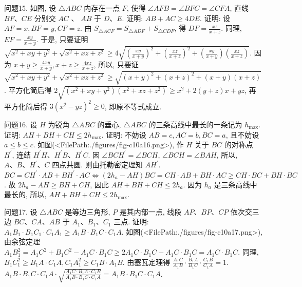 问题15. 如图, 设 $\triangle A B C$ 内存在一点 $F$, 使得 $\angle A F B= \angle B F C=\angle C F A$, 直线 $B F 、 C E$ 分别交 $A C$ 、 $A B$ 于 $D 、 E$. 证明: $A B+A C \geqslant 4 D E$.
证明: 设 $A F=x, B F=y, C F=z$. 由 $S_{\triangle A C F}=S_{\triangle A D F}+S_{\triangle C D F}$, 得 $D F=\frac{x z}{x+z}$. 同理, $E F=\frac{x y}{x+y}$. 于是, 只要证明 $\sqrt{x^2+x y+y^2}+\sqrt{x^2+x z+z^2} \geqslant 4 \sqrt{\left(\frac{x y}{x+y}\right)^2+\left(\frac{x z}{x+z}\right)^2+\left(\frac{x y}{x+y}\right)\left(\frac{x z}{x+z}\right)}$. 因为 $x+ y \geqslant \frac{4 x y}{x+y}, x+z \geqslant \frac{4 x z}{x+z}$, 所以, 只要证 $\sqrt{x^2+x y+y^2}+\sqrt{x^2+x z+z^2} \geqslant \sqrt{(x+y)^2+(x+z)^2+(x+y)(x+z)}$.
平方化简后得 $2 \sqrt{\left(x^2+x y+y^2\right)\left(x^2+x z+z^2\right)} \geqslant x^2+2(y+z) x+y z$, 再平方化简后得 $3\left(x^2-y z\right)^2 \geqslant 0$, 即原不等式成立.



问题16. 设 $H$ 为锐角 $\triangle A B C$ 的垂心, $\triangle A B C$ 的三条高线中最长的一条记为 $h_{\max }$. 证明: $A H+B H+ C H \leqslant 2 h_{\max }$.
证明: 不妨设 $A B=c, A C=b, B C=a$, 且不妨设 $a \leqslant b \leqslant c$. 如图(<FilePath:./figures/fig-c10a16.png>), 作 $H$ 关于 $B C$ 的对称点 $H^{\prime}$, 连结 $H^{\prime} H 、 H^{\prime} B 、 H^{\prime} C$. 因 $\angle B C H^{\prime}=\angle B C H$, $\angle B C H=\angle B A H$, 所以, $A 、 B 、 H^{\prime} 、 C$ 四点共圆.
则由托勒密定理知 $A H^{\prime}$. $B C=C H^{\prime} \cdot A B+B H^{\prime} \cdot A C \Leftrightarrow\left(2 h_a-A H\right) B C=C H \cdot A B+B H \cdot A C \geqslant C H \cdot B C+B H \cdot B C$. 故 $2 h_a-A H \geqslant B H+C H$, 因此 $A H+B H+C H \leqslant 2 h_a$. 因为 $h_a$ 是三条高线中最长的, 所以, $A H+B H+C H \leqslant 2 h_{\max }$.



问题17. 设 $\triangle A B C$ 是等边三角形, $P$ 是其内部一点, 线段 $A P 、 B P 、 C P$ 依次交三边 $B C 、 C A 、 A B$ 于 $A_1 、 B_1 、 C_1$ 三点.
证明: $A_1 B_1 \cdot B_1 C_1 \cdot C_1 A_1 \geqslant A_1 B \cdot B_1 C \cdot C_1 A$.
如图(<FilePath:./figures/fig-c10a17.png>), 由余弦定理 $A_1 B_1^2=A_1 C^2+B_1 C^2-A_1 C \cdot B_1 C \geqslant 2 A_1 C \cdot B_1 C- A_1 C \cdot B_1 C=A_1 C \cdot B_1 C$. 同理, $B_1 C_1^2 \geqslant B_1 A \cdot C_1 A, C_1 A_1^2 \geqslant C_1 B \cdot A_1 B$. 由塞瓦定理得 $\frac{A_1 C}{A_1 B} \cdot \frac{B_1 A}{B_1 C} \cdot \frac{C_1 B}{C_1 A}=1$. $A_1 B \cdot B_1 C \cdot C_1 A \cdot \sqrt{\frac{A_1 C \cdot B_1 A \cdot C_1 B}{A_1 B \cdot B_1 C \cdot C_1 A}}=A_1 B \cdot B_1 C \cdot C_1 A$.


